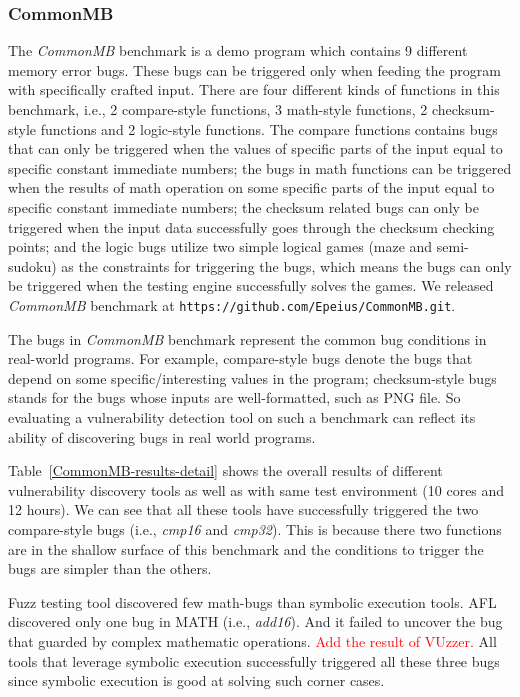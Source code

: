 \subsubsection{CommonMB}
\noindent The \emph{CommonMB} benchmark is a demo program which contains 
9 different memory error bugs. These bugs can be triggered only when 
feeding the program with specifically crafted input. There are four 
different kinds of functions in this benchmark, i.e., 2 compare-style 
functions, 3 math-style functions, 2 checksum-style functions and 2 
logic-style functions. The compare functions contains bugs that can 
only be triggered when the values of specific parts of the input equal 
to specific constant immediate numbers; the bugs in math functions 
can be triggered when the results of math operation on some specific 
parts of the input equal to specific constant immediate numbers; the 
checksum related bugs can only be triggered when the input data 
successfully goes through the checksum checking points; and the logic 
bugs utilize two simple logical games (maze and semi-sudoku) as the 
constraints for triggering the bugs, which means the bugs can only be 
triggered when the testing engine successfully solves the games. We 
released \emph{CommonMB} benchmark at \texttt{https://github.com/Epeius/CommonMB.git}.

The bugs in \emph{CommonMB} benchmark represent the common bug conditions 
in real-world programs. For example, compare-style bugs denote the bugs 
that depend on some specific/interesting values in the program; 
checksum-style bugs stands for the bugs whose inputs are well-formatted, 
such as PNG file.
So evaluating a vulnerability detection tool on such a benchmark can 
reflect its ability of discovering bugs in real world programs.

Table~\ref{CommonMB-results-detail} shows the overall results of 
different vulnerability discovery tools as well as \prototype 
with same test environment (10 cores and 12 hours).
We can see that all these tools have successfully triggered the 
two compare-style bugs (i.e., \textit{cmp16} and \textit{cmp32}). 
This is because there two functions are in the shallow surface of 
this benchmark and the conditions to trigger the bugs are simpler 
than the others.  

Fuzz testing tool discovered few math-bugs than symbolic execution 
tools. AFL discovered only one bug in MATH (i.e., \textit{add16}).
And it failed to uncover the bug that guarded by complex mathematic operations.
\textcolor{red}{Add the result of VUzzer.} 
All tools that leverage symbolic execution successfully 
triggered all these three bugs since symbolic execution is good at 
solving such corner cases. 

